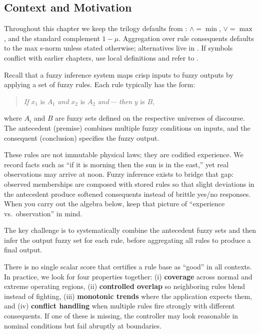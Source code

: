 \subsection{Context and Motivation}
\label{sec:fuzzyinference_context_and_motivation}

\begin{tcolorbox}[summarybox, title={Notation handoff}]
Throughout this chapter we keep the trilogy defaults from : \(\wedge=\min\), \(\vee=\max\), and the standard complement \(1-\mu\). Aggregation over rule consequents defaults to the max s\hyp{}norm unless stated otherwise; alternatives live in . If symbols conflict with earlier chapters, use local definitions and refer to .
\end{tcolorbox}

Recall that a fuzzy inference system maps crisp inputs to fuzzy outputs by applying a set of fuzzy rules. Each rule typically has the form:

\begin{quote}
\textit{If} $x_1$ is $A_1$ \textit{and} $x_2$ is $A_2$ \textit{and} $\cdots$ \textit{then} $y$ is $B$,
\end{quote}

where $A_i$ and $B$ are fuzzy sets defined on the respective universes of discourse. The antecedent (premise) combines multiple fuzzy conditions on inputs, and the consequent (conclusion) specifies the fuzzy output.

\begin{tcolorbox}[summarybox, title={Author's note: rules as lived experience}]
These rules are not immutable physical laws; they are codified experience. We record facts such as ``if it is morning then the sun is in the east,'' yet real observations may arrive at noon. Fuzzy inference exists to bridge that gap: observed memberships are composed with stored rules so that slight deviations in the antecedent produce softened consequents instead of brittle yes/no responses. When you carry out the algebra below, keep that picture of ``experience vs.\ observation'' in mind.
\end{tcolorbox}

The key challenge is to systematically combine the antecedent fuzzy sets and then infer the output fuzzy set for each rule, before aggregating all rules to produce a final output.

\begin{tcolorbox}[summarybox, title={Author's note: what makes a rule base ``good''?}]
There is no single scalar score that certifies a rule base as ``good'' in all contexts. In practice, we look for four properties together: (i) \textbf{coverage} across normal and extreme operating regions, (ii) \textbf{controlled overlap} so neighboring rules blend instead of fighting, (iii) \textbf{monotonic trends} where the application expects them, and (iv) \textbf{conflict handling} when multiple rules fire strongly with different consequents. If one of these is missing, the controller may look reasonable in nominal conditions but fail abruptly at boundaries.
\end{tcolorbox}

